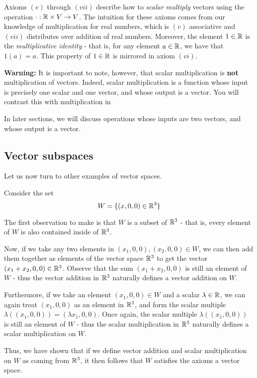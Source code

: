     Axioms $(v)$ through $(vii)$ describe how to \textit{scalar multiply} vectors using the operation $\cdot : \mathbb{R} \times V \to V$.  The intuition for these axioms comes from our knowledge of multiplication for real numbers, which is $(v)$ associative and $(vii)$ distributes over addition of real numbers.  Moreover, the element $1 \in \mathbb{R}$ is the \textit{multiplicative identity} - that is, for any element $a \in \mathbb{R}$, we have that $1(a) = a$.  This property of $1\in \mathbb{R}$ is mirrored in axiom $(vi)$.

    \begin{example}
    \textbf{Warning:} It is important to note, however, that scalar multiplication is \textbf{not} multiplication of vectors.  Indeed, scalar multiplication is a function whose input is precisely one scalar and one vector, and whose output is a vector.  You will contrast this with multiplication in 
    
    In later sections, we will discuss operations whose inputs are two vectors, and whose output is a vector.
    \end{example}
    
    \subsection{Vector subspaces}
    
    Let us now turn to other examples of vector spaces.
    
    \begin{example}
    Consider the set $$W = \{(x, 0, 0) \in \mathbb{R}^3 \}$$
    
    The first observation to make is that $W$ is a subset of $\mathbb{R}^3$ - that is, every element of $W$ is also contained inside of $\mathbb{R}^3$.  
    
    
    Now, if we take any two elements in $(x_1,0,0), (x_2,0,0) \in W$, we can then add them together as elements of the vector space $\mathbb{R}^3$ to get the vector $(x_1 + x_2, 0,0) \in \mathbb{R}^3$.  Observe that the sum $(x_1 + x_2, 0,0)$ is still an element of $W$ - thus the vector addition in $\mathbb{R}^3$ naturally defines a vector addition on $W$.
    
    Furthermore, if we take an element $(x_1,0,0) \in W$ and a scalar $\lambda \in \mathbb{R}$, we can again treat $(x_1,0,0)$ as an element in $\mathbb{R}^3$, and form the scalar multiple $\lambda((x_1,0,0)) = (\lambda x_1,0,0)$.  Once again, the scalar multiple $\lambda((x_1,0,0))$ is still an element of $W$ - thus the scalar multiplication in $\mathbb{R}^3$ naturally defines a scalar multiplication on $W$.
    
    Thus, we have shown that if we define vector addition and scalar multiplication on $W$ as coming from $\mathbb{R}^3$, it then follows that $W$ satisfies the axioms a vector space.
    \end{example}

